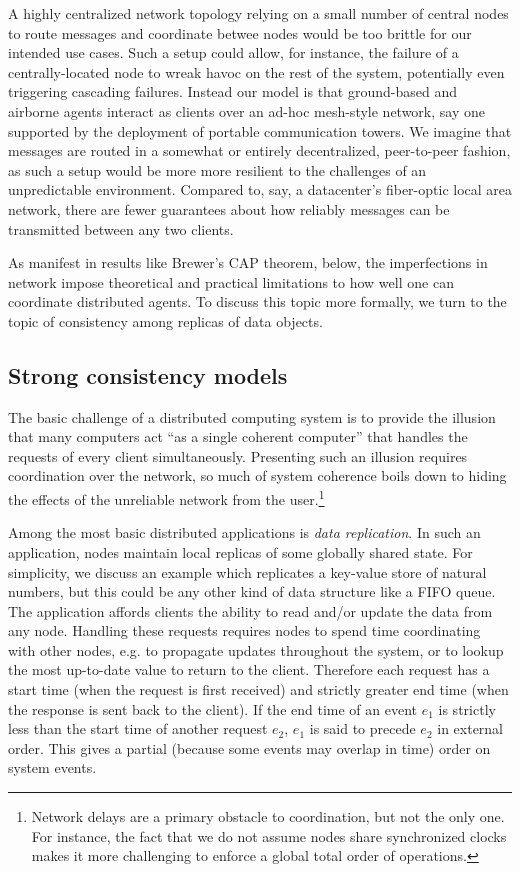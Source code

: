 A highly centralized network topology relying on a small number of
central nodes to route messages and coordinate betwee nodes would be
too brittle for our intended use cases. Such a setup could allow, for
instance, the failure of a centrally-located node to wreak havoc on
the rest of the system, potentially even triggering cascading
failures. Instead our model is that ground-based and airborne agents
interact as clients over an ad-hoc mesh-style network, say one
supported by the deployment of portable communication towers. We
imagine that messages are routed in a somewhat or entirely
decentralized, peer-to-peer fashion, as such a setup would be more
more resilient to the challenges of an unpredictable
environment. Compared to, say, a datacenter's fiber-optic local area
network, there are fewer guarantees about how reliably messages can be
transmitted between any two clients.

As manifest in results like Brewer's CAP theorem, below, the
imperfections in network impose theoretical and practical limitations
to how well one can coordinate distributed agents. To discuss this
topic more formally, we turn to the topic of consistency among
replicas of data objects.

\subsection{Strong consistency models}

The basic challenge of a distributed computing system is to provide
the illusion that many computers act ``as a single coherent computer''
\cite{TanenbaumSteen07} that handles the requests of every client
simultaneously. Presenting such an illusion requires coordination over
the network, so much of system coherence boils down to hiding the
effects of the unreliable network from the user.\footnote{Network
delays are a primary obstacle to coordination, but not the only
one. For instance, the fact that we do not assume nodes share
synchronized clocks makes it more challenging to enforce a global
total order of operations.}

Among the most basic distributed applications is \emph{data
replication}. In such an application, nodes maintain local replicas of
some globally shared state. For simplicity, we discuss an example
which replicates a key-value store of natural numbers, but this could
be any other kind of data structure like a FIFO queue. The application
affords clients the ability to read and/or update the data from any
node. Handling these requests requires nodes to spend time
coordinating with other nodes, e.g. to propagate updates throughout
the system, or to lookup the most up-to-date value to return to the
client. Therefore each request has a start time (when the request is
first received) and strictly greater end time (when the response is
sent back to the client). If the end time of an event $e_1$ is
strictly less than the start time of another request $e_2$, $e_1$ is
said to precede $e_2$ in external order. This gives a partial (because
some events may overlap in time) order on system events.

